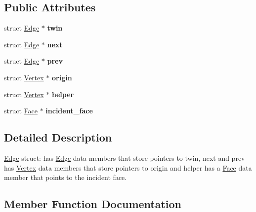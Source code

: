 \subsection*{Public Attributes}
\begin{DoxyCompactItemize}
\item 
\mbox{\label{structEdge_a45fb96b9c533f450b1f7f4a03a353d96}} 
struct \hyperlink{structEdge}{Edge} $\ast$ {\bfseries twin}
\item 
\mbox{\label{structEdge_a3cf3d57ae65110456b5d809a658757fc}} 
struct \hyperlink{structEdge}{Edge} $\ast$ {\bfseries next}
\item 
\mbox{\label{structEdge_ae4477dab61b692f0a1bc3241e3bfaddd}} 
struct \hyperlink{structEdge}{Edge} $\ast$ {\bfseries prev}
\item 
\mbox{\label{structEdge_a2de3c697d4a77673df6bcac7cc7b5b08}} 
struct \hyperlink{structVertex}{Vertex} $\ast$ {\bfseries origin}
\item 
\mbox{\label{structEdge_abb06ddf30396af97c26a5a43bec10ef7}} 
struct \hyperlink{structVertex}{Vertex} $\ast$ {\bfseries helper}
\item 
\mbox{\label{structEdge_aeca88bcc64d0e3a1393f87613bfc5fe8}} 
struct \hyperlink{structFace}{Face} $\ast$ {\bfseries incident\+\_\+face}
\end{DoxyCompactItemize}


\subsection{Detailed Description}
\hyperlink{structEdge}{Edge} struct\+: has \hyperlink{structEdge}{Edge} data members that store pointers to twin, next and prev has \hyperlink{structVertex}{Vertex} data members that store pointers to origin and helper has a \hyperlink{structFace}{Face} data member that points to the incident face. 

\subsection{Member Function Documentation}
\mbox{\label{structEdge_a3fe7e84f2ef319dbe30d48c4d268832d}} 
